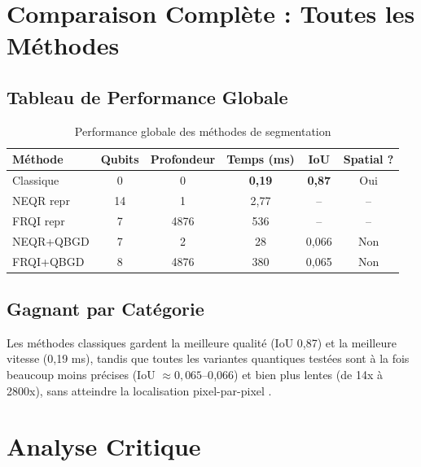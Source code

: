 \documentclass[12pt,a4paper]{report}
\begin{document}
	\section{Comparaison Complète : Toutes les Méthodes}
	
	\subsection{Tableau de Performance Globale}
	
	\begin{table}[H]
		\centering
		\caption{Performance globale des méthodes de segmentation}
		\label{tab:perf-globale}
		\begin{tabular}{lccccc}
			\hline
			\textbf{Méthode}   & \textbf{Qubits} & \textbf{Profondeur} & \textbf{Temps (ms)} & \textbf{IoU} & \textbf{Spatial ?} \\
			\hline
			Classique    & 0  & 0     & \textbf{0,19}  & \textbf{0,87} & Oui \\
			NEQR repr    & 14 & 1     & 2,77           & --            & --  \\
			FRQI repr    & 7  & 4876  & 536            & --            & --  \\
			NEQR+QBGD    & 7  & 2     & 28             & 0,066         & Non \\
			FRQI+QBGD    & 8  & 4876  & 380            & 0,065         & Non \\
			\hline
		\end{tabular}
	\end{table}
	
	\subsection{Gagnant par Catégorie}
	
	Les méthodes classiques gardent la meilleure qualité (IoU 0,87) et la meilleure vitesse (0,19 ms), tandis que toutes les variantes quantiques testées sont à la fois beaucoup moins précises (IoU \(\approx 0{,}065\)–0{,}066) et bien plus lentes (de 14x à 2800x), sans atteindre la localisation pixel-par-pixel \cite{stauffer1999,zhang2013neqr,li2010frqi,wang2023qbgd}.
	
	\section{Analyse Critique}
	
\end{document}
